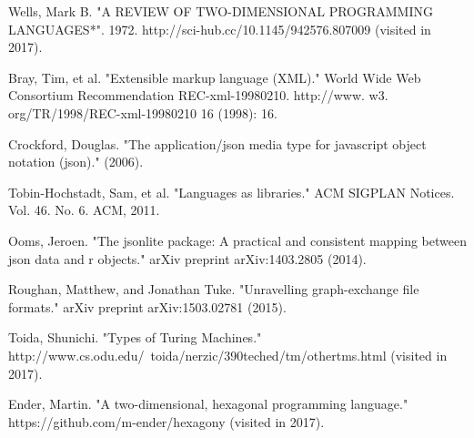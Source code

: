 \documentclass[journal]{IEEEtran}
\begin{document}
\begin{thebibliography}{4}

Wells, Mark B. "A REVIEW OF TWO-DIMENSIONAL PROGRAMMING LANGUAGES*". 1972. http://sci-hub.cc/10.1145/942576.807009 (visited in 2017).

Bray, Tim, et al. "Extensible markup language (XML)." World Wide Web Consortium Recommendation REC-xml-19980210. http://www. w3. org/TR/1998/REC-xml-19980210 16 (1998): 16.

Crockford, Douglas. "The application/json media type for javascript object notation (json)." (2006).

Tobin-Hochstadt, Sam, et al. "Languages as libraries." ACM SIGPLAN Notices. Vol. 46. No. 6. ACM, 2011.

Ooms, Jeroen. "The jsonlite package: A practical and consistent mapping between json data and r objects." arXiv preprint arXiv:1403.2805 (2014).

Roughan, Matthew, and Jonathan Tuke. "Unravelling graph-exchange file formats." arXiv preprint arXiv:1503.02781 (2015).

Toida, Shunichi. "Types of Turing Machines." http://www.cs.odu.edu/~toida/nerzic/390teched/tm/othertms.html (visited in 2017).

Ender, Martin. "A two-dimensional, hexagonal programming language." https://github.com/m-ender/hexagony (visited in 2017).



\end{thebibliography}

\ifCLASSOPTIONcaptionsoff
  \newpage
\fi
\end{document}
